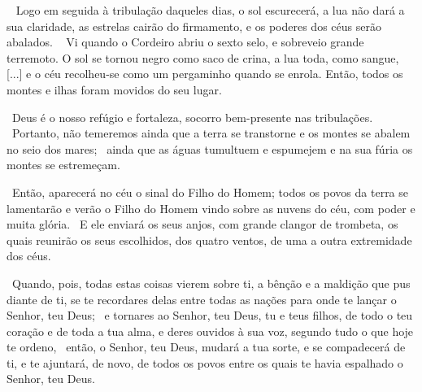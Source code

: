 \documentclass[12pt,aspectratio=169]{beamer}
\newcommand{\ver}[1]{%
    \raisebox{0.50ex}{%
        \scalebox{1.1}{%
            \pmb{\textbf{\textcolor{BSpbg}{#1}}}%
        }%
    }%
}
\newcommand{\QUOTE}[1]{%
    \par\noindent\hspace*{0.1\linewidth}%
    \begin{minipage}{0.8\linewidth}%
        \linespread{1.35}\large{#1}%
    \end{minipage}%
}
\newcommand{\WIDEQUOTE}[1]{%
    \par\noindent\hspace*{0.02\linewidth}%
    \begin{minipage}{0.92\linewidth}%
        \linespread{1.25}\large{#1}%
    \end{minipage}%
}
\newcommand{\RED}[1]{{\textcolor{TXred}{#1}}}
\newcommand{\ORA}[1]{{\textcolor{TXora}{#1}}}
\newcommand{\YEL}[1]{{\textcolor{TXyel}{#1}}}
\newcommand{\GRE}[1]{{\textcolor{TXgre}{#1}}}
\newcommand{\CYA}[1]{{\textcolor{TXcya}{#1}}}
\newcommand{\BLU}[1]{{\textcolor{TXblu}{#1}}}
\newcommand{\MAG}[1]{{\textcolor{TXmag}{#1}}}
\newcommand{\BRI}[1]{{\textcolor{BSpbg}{#1}}}   %
\begin{document}
    \begin{frame}
        \QUOTE{%
            \ver{(ARA) Mt~24.29}~%
            Logo em seguida à tribulação daqueles dias, o \YEL{sol escurecerá},  a  \RED{lua
            não dará a  sua  claridade},  as  \GRE{estrelas  cairão  do  firmamento},  e  os
            \CYA{poderes dos céus serão abalados}.
            \ver{(ARA) Ap~6.12,14}~%
            Vi  quando  o  Cordeiro  abriu  o  \BLU{sexto  selo},  e  sobreveio  \MAG{grande
            terremoto}. O \YEL{sol se tornou negro} como saco de  crina,  a  \RED{lua  toda,
            como sangue}, [...] e o  \CYA{céu  recolheu-se  como  um  pergaminho  quando  se
            enrola}. Então, todos os \MAG{montes e ilhas foram movidos do seu lugar}.
        }
    \end{frame}

    \begin{frame}
        \QUOTE{%
            \ver{(ARA) Sl~46.1}~Deus é o nosso refúgio e fortaleza, socorro bem-presente nas
            \RED{tribulações}. \ver{2}~Portanto, não temeremos ainda  que  a  \ORA{terra  se
            transtorne} e os \YEL{montes se abalem no seio dos mares}; \ver{3}~ainda que  as
            \GRE{águas tumultuem e espumejem} e na sua fúria os \YEL{montes se estremeçam}.
        }
    \end{frame}

    \begin{frame}
        \QUOTE{%
            \ver{(ARA) Mt~24.30}~Então, aparecerá no céu o \YEL{sinal do  Filho  do  Homem};
            todos os povos da terra se lamentarão e  \GRE{verão  o  Filho  do  Homem}  vindo
            \CYA{sobre as nuvens do céu}, com \MAG{poder e  muita  glória}.  \ver{31}~E  ele
            enviará os seus \YEL{anjos}, com grande clangor de trombeta, os  quais  reunirão
            os seus \BLU{es}\BRI{co}\BLU{lhi}\BRI{dos}, dos quatro  ventos,  \GRE{de  uma  a
            outra extremidade dos céus}.
        }
    \end{frame}

    \begin{frame}
        \WIDEQUOTE{%
            \ver{(ARA) Dt~30.1}~Quando, pois, todas estas coisas vierem sobre ti, a bênção e a
            maldição que pus diante de ti, se te recordares delas entre todas as nações para
            onde te lançar o Senhor, teu Deus; \ver{2}~e tornares ao Senhor, teu Deus, tu e teus
            filhos, de todo o teu coração e de toda a tua alma, e deres ouvidos à sua voz,
            segundo tudo o que hoje te ordeno, \ver{3}~então, o Senhor, teu Deus, mudará a tua
            sorte, e se compadecerá de ti, e te ajuntará, de novo, de todos os povos entre os
            quais te havia espalhado o Senhor, teu Deus.
        }
    \end{frame}
\end{document}
